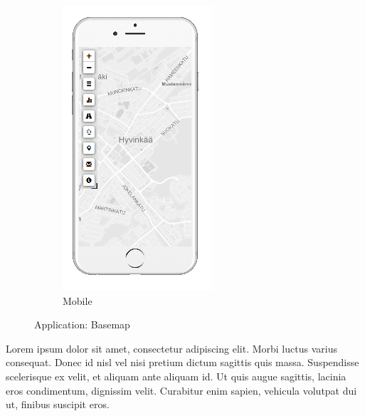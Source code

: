 \begin{figure}[ht]
\begin{subfigure}[b]{0.2\textwidth}
        \includegraphics[width=\textwidth]
          {img/c02-application/png/mobile-basemap.png}
        \caption{Mobile}
    \end{subfigure}
    \caption{Application: Basemap}
\end{figure}

Lorem ipsum dolor sit amet, consectetur adipiscing elit. Morbi luctus varius consequat. Donec id nisl vel nisi pretium dictum sagittis quis massa. Suspendisse scelerisque ex velit, et aliquam ante aliquam id. Ut quis augue sagittis, lacinia eros condimentum, dignissim velit. Curabitur enim sapien, vehicula volutpat dui ut, finibus suscipit eros. 

